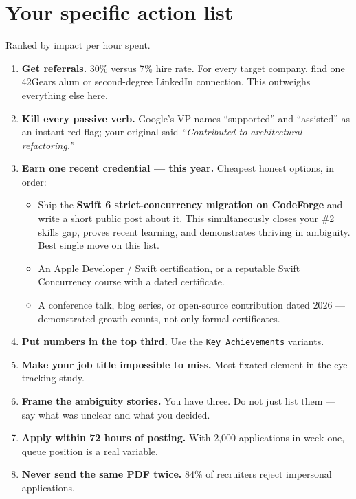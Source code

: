 \documentclass[11pt,a4paper]{article}
\begin{document}
\section{Your specific action list}

Ranked by impact per hour spent.

\begin{enumerate}
  \item \textbf{Get referrals.} 30\% versus 7\% hire rate. For every target company, find one
        42Gears alum or second-degree LinkedIn connection. This outweighs everything else here.
  \item \textbf{Kill every passive verb.} Google's VP names ``supported'' and ``assisted'' as
        an instant red flag; your original said \emph{``Contributed to architectural
        refactoring.''}
  \item \textbf{Earn one recent credential --- this year.} Cheapest honest options, in order:
        \begin{itemize}
          \item Ship the \textbf{Swift 6 strict-concurrency migration on CodeForge} and write
                a short public post about it. This simultaneously closes your \#2 skills gap,
                proves recent learning, and demonstrates thriving in ambiguity. Best single
                move on this list.
          \item An Apple Developer / Swift certification, or a reputable Swift Concurrency
                course with a dated certificate.
          \item A conference talk, blog series, or open-source contribution dated 2026 ---
                demonstrated growth counts, not only formal certificates.
        \end{itemize}
  \item \textbf{Put numbers in the top third.} Use the \texttt{Key Achievements} variants.
  \item \textbf{Make your job title impossible to miss.} Most-fixated element in the
        eye-tracking study.
  \item \textbf{Frame the ambiguity stories.} You have three. Do not just list them --- say
        what was unclear and what you decided.
  \item \textbf{Apply within 72 hours of posting.} With 2{,}000 applications in week one,
        queue position is a real variable.
  \item \textbf{Never send the same PDF twice.} 84\% of recruiters reject impersonal
        applications.
\end{enumerate}
\end{document}
